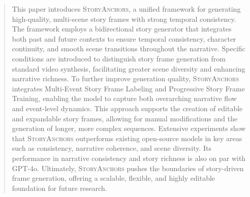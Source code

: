 \begin{abstract}
\label{sec:abstract}
\vspace{-0.2cm}

This paper introduces \textsc{StoryAnchors}, a unified framework for generating high-quality, multi-scene story frames with strong temporal consistency.
The framework employs a bidirectional story generator that integrates both past and future contexts to ensure temporal consistency, character continuity, and smooth scene transitions throughout the narrative. Specific conditions are introduced to distinguish story frame generation from standard video synthesis, facilitating greater scene diversity and enhancing narrative richness.
To further improve generation quality, \textsc{StoryAnchors} integrates Multi-Event Story Frame Labeling and Progressive Story Frame Training, enabling the model to capture both overarching narrative flow and event-level dynamics. This approach supports the creation of editable and expandable story frames, allowing for manual modifications and the generation of longer, more complex sequences.
Extensive experiments show that \textsc{StoryAnchors} outperforms existing open-source models in key areas such as consistency, narrative coherence, and scene diversity. Its performance in narrative consistency and story richness is also on par with GPT-4o. 
Ultimately, \textsc{StoryAnchors} pushes the boundaries of story-driven frame generation, offering a scalable, flexible, and highly editable foundation for future research.

\end{abstract}